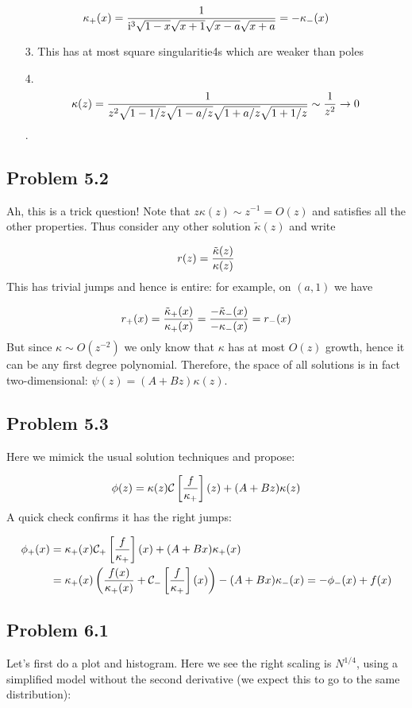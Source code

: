 \documentclass[12pt,landscape]{article}
\def\I{ {\rm i} }
\def\CC{ {\cal C} }
\def\br[#1]{\left[{#1}\right]}
\begin{document}
{\[
\kappa_+(x) = {1 \over \I^3 \sqrt{1-x}\sqrt{x+1}\sqrt{x-a}\sqrt{x+a}} =  -\kappa_-(x)
\]
\begin{itemize}
\item[3. ] This has at most square singularitie4s which are weaker than poles


\item[4. ] \[
\kappa(z) = {1 \over z^2 \sqrt{1-1/z}\sqrt{1-a/z} \sqrt{1+a/z} \sqrt{1+1/z}} \sim {1 \over z^2} \rightarrow 0
\]
.

\end{itemize}
\subsection{Problem 5.2}
Ah, this is a trick question! Note that $z \kappa(z) \sim z^{-1} = O(z)$ and satisfies all the other properties. Thus consider any other solution $\tilde \kappa(z)$ and write

\[
r(z) = {\tilde \kappa(z) \over \kappa(z) }
\]
This has trivial jumps and hence is entire: for example, on $(a,1)$ we have

\[
r_+(x) = {\tilde \kappa_+(x) \over \kappa_+(x) }  = {-\tilde \kappa_-(x) \over -\kappa_-(x) }  = r_-(x)
\]
But since $\kappa \sim O(z^{-2})$ we only know that $\kappa$ has at most $O(z)$ growth, hence it can be any first degree polynomial.  Therefore, the space of all solutions is in fact two-dimensional: $\psi(z) = (A + Bz) \kappa(z)$.

\subsection{Problem 5.3}
Here we mimick the usual solution techniques and propose:

\[
\phi(z) = \kappa(z) \CC\br[{f \over \kappa_+}](z) + (A+Bz) \kappa(z)
\]
A quick check confirms it has the right jumps:

\begin{align*}
\phi_+(x) &= \kappa_+(x) \CC_+\br[{f \over \kappa_+}](x) + (A+Bx) \kappa_+(x)\\
& =\kappa_+(x) \left({f(x) \over \kappa_+(x)} + \CC_-\br[{f \over \kappa_+}](x)\right) - (A+Bx) \kappa_-(x) = -\phi_-(x) + f(x)
\end{align*}
\subsection{Problem 6.1}
Let's first do a plot and histogram. Here we see the right scaling is $N^{1/4}$, using a simplified model without the second derivative (we expect this to go to the same distribution):


}
\end{document}
